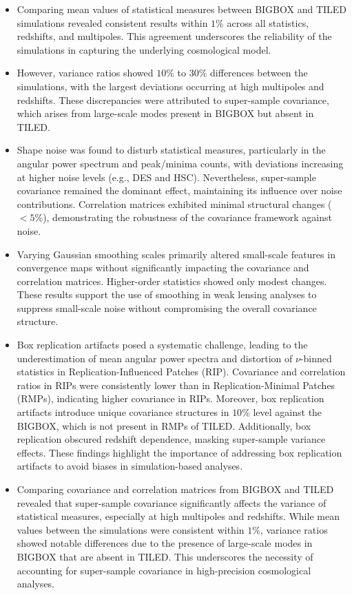 \begin{itemize}
    \item Comparing mean values of statistical measures between BIGBOX and TILED simulations revealed consistent results within $1\%$ across all statistics, redshifts, and multipoles. This agreement underscores the reliability of the simulations in capturing the underlying cosmological model.
    \item However, variance ratios showed $10\%$ to $30\%$ differences between the simulations, with the largest deviations occurring at high multipoles and redshifts. These discrepancies were attributed to super-sample covariance, which arises from large-scale modes present in BIGBOX but absent in TILED. 
    \item Shape noise was found to disturb statistical measures, particularly in the angular power spectrum and peak/minima counts, with deviations increasing at higher noise levels (e.g., DES and HSC). Nevertheless, super-sample covariance remained the dominant effect, maintaining its influence over noise contributions. Correlation matrices exhibited minimal structural changes ($<5\%$), demonstrating the robustness of the covariance framework against noise.
    \item Varying Gaussian smoothing scales primarily altered small-scale features in convergence maps without significantly impacting the covariance and correlation matrices. Higher-order statistics showed only modest changes. These results support the use of smoothing in weak lensing analyses to suppress small-scale noise without compromising the overall covariance structure.
    \item Box replication artifacts posed a systematic challenge, leading to the underestimation of mean angular power spectra and distortion of $\nu$-binned statistics in Replication-Influenced Patches (RIP). Covariance and correlation ratios in RIPs were consistently lower than in Replication-Minimal Patches (RMPs), indicating higher covariance in RIPs.
    Moreover, box replication artifacts introduce unique covariance structures in $10\%$ level against the BIGBOX, which is not present in RMPs of TILED.
    Additionally, box replication obscured redshift dependence, masking super-sample variance effects. These findings highlight the importance of addressing box replication artifacts to avoid biases in simulation-based analyses.
    \item Comparing covariance and correlation matrices from BIGBOX and TILED revealed that super-sample covariance significantly affects the variance of statistical measures, especially at high multipoles and redshifts. While mean values between the simulations were consistent within $1\%$, variance ratios showed notable differences due to the presence of large-scale modes in BIGBOX that are absent in TILED. This underscores the necessity of accounting for super-sample covariance in high-precision cosmological analyses.
\end{itemize}

